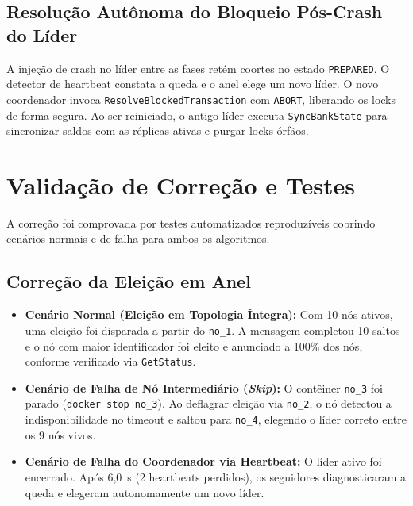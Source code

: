 \documentclass[conference]{IEEEtran}
\begin{document}
\subsection{Resolução Autônoma do Bloqueio Pós-Crash do Líder}
A injeção de crash no líder entre as fases retém coortes no estado \texttt{PREPARED}. O detector de heartbeat constata a queda e o anel elege um novo líder. O novo coordenador invoca \texttt{ResolveBlockedTransaction} com \texttt{ABORT}, liberando os locks de forma segura. Ao ser reiniciado, o antigo líder executa \texttt{SyncBankState} para sincronizar saldos com as réplicas ativas e purgar locks órfãos.

\section{Validação de Correção e Testes}
A correção foi comprovada por testes automatizados reproduzíveis cobrindo cenários normais e de falha para ambos os algoritmos.

\subsection{Correção da Eleição em Anel}
\begin{itemize}
  \item \textbf{Cenário Normal (Eleição em Topologia Íntegra):} Com 10 nós ativos, uma eleição foi disparada a partir do \texttt{no\_1}. A mensagem completou 10 saltos e o nó com maior identificador foi eleito e anunciado a 100\% dos nós, conforme verificado via \texttt{GetStatus}.
  \item \textbf{Cenário de Falha de Nó Intermediário (\textit{Skip}):} O contêiner \texttt{no\_3} foi parado (\texttt{docker stop no\_3}). Ao deflagrar eleição via \texttt{no\_2}, o nó detectou a indisponibilidade no timeout e saltou para \texttt{no\_4}, elegendo o líder correto entre os 9 nós vivos.
  \item \textbf{Cenário de Falha do Coordenador via Heartbeat:} O líder ativo foi encerrado. Após 6,0~s (2 heartbeats perdidos), os seguidores diagnosticaram a queda e elegeram autonomamente um novo líder.
\end{itemize}
\end{document}
